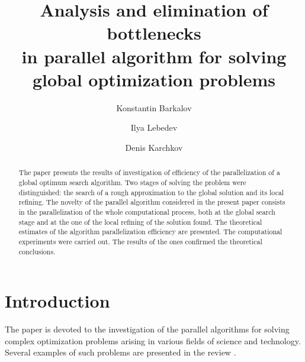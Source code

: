 \documentclass[runningheads]{llncs}
\begin{document}
%
\title{Analysis and elimination of bottlenecks\\ in parallel algorithm for solving\\ global optimization problems}
%
%
\author{
Konstantin Barkalov  \and
Ilya Lebedev  \and
Denis Karchkov 
}
%
%

%
\maketitle              %
%
\begin{abstract}
The paper presents the results of investigation of efficiency of the parallelization of a global optimum search algorithm. Two stages of solving the problem were distinguished: the search of a rough approximation to the global solution and its local refining. The novelty of the parallel algorithm considered in the present paper consists in the parallelization of the whole computational process, both at the global search stage and at the one of the local refining of the solution found. The theoretical estimates of the algorithm parallelization efficiency are presented. The computational experiments were carried out. The results of the ones confirmed the theoretical conclusions.

\end{abstract}
%
%
%
\section{Introduction}

The paper is devoted to the investigation of the parallel algorithms for solving complex optimization problems arising in various fields of science and technology. Several examples of such problems are presented in the review \cite{Pinter2006}.
\end{document}
